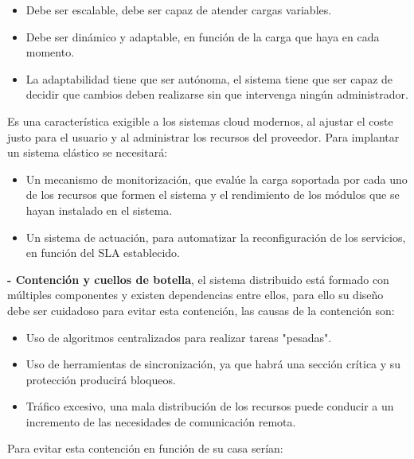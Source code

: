 \documentclass[12pt]{amsart}
\begin{document}
    \begin{itemize}
        \item Debe ser escalable, debe ser capaz de atender cargas variables.
        
        \item Debe ser dinámico y adaptable, en función de la carga que haya en cada momento. 
        \item La adaptabilidad tiene que ser autónoma, el sistema tiene que ser capaz de decidir que cambios deben realizarse sin que intervenga ningún administrador.
    \end{itemize}
    
    Es una característica exigible a los sistemas cloud modernos, al ajustar el coste justo para el usuario y al administrar los recursos del proveedor. Para implantar un sistema elástico se necesitará:
    
    \begin{itemize}
        \item Un mecanismo de monitorización, que evalúe la carga soportada por cada uno de los recursos que formen el sistema y el rendimiento de los módulos que se hayan instalado en el sistema.
        
        \item Un sistema de actuación, para automatizar la reconfiguración de los servicios, en función del SLA establecido.
    \end{itemize}
    
    \textbf{- Contención y cuellos de botella}, el sistema distribuido está formado con múltiples componentes y existen dependencias entre ellos, para ello su diseño debe ser cuidadoso para evitar esta contención, las causas de la contención son:
    
    \begin{itemize}
        \item Uso de algoritmos centralizados para realizar tareas "pesadas".
        
        \item Uso de herramientas de sincronización, ya que habrá una sección crítica y su protección producirá bloqueos.
        
        \item Tráfico excesivo, una mala distribución de los recursos puede conducir a un incremento de las necesidades de comunicación remota.
    \end{itemize}
    
    Para evitar esta contención en función de su casa serían:
    
\end{document}
